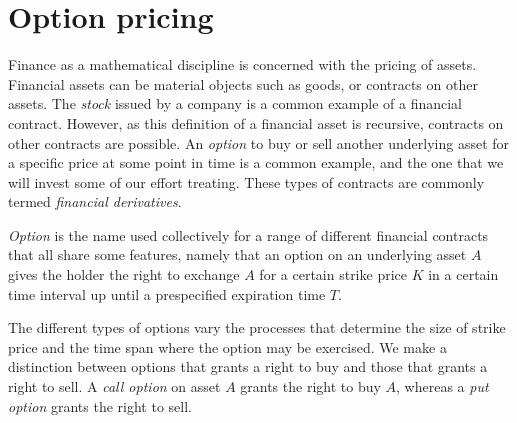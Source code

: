 \section{Option pricing}
Finance as a mathematical discipline is concerned with the pricing of
assets.  Financial assets can be material objects such as goods, or
contracts on other assets. The \emph{stock} issued by a company is a
common example of a financial contract. However, as this definition of
a financial asset is recursive, contracts on other contracts are
possible. An \emph{option} to buy or sell another underlying asset for
a specific price at some point in time is a common example, and the
one that we will invest some of our effort treating. These types of
contracts are commonly termed \emph{financial derivatives}.

\emph{Option} is the name used collectively for a range of different
financial contracts that all share some features, namely that an
option on an underlying asset $A$ gives the holder the right to
exchange $A$ for a certain strike price $K$ in a certain time interval
up until a prespecified expiration time $T$.

The different types of options vary the processes that determine the
size of strike price and the time span where the option may be
exercised.  We make a distinction between options that grants a right
to buy and those that grants a right to sell. A \emph{call option} on
asset $A$ grants the right to buy $A$, whereas a \emph{put option}
grants the right to sell.

